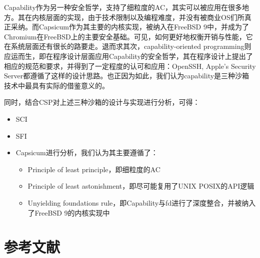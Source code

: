 \documentclass[final,5p,times]{elsarticle}
\begin{document}

Capability作为另一种安全哲学，支持了细粒度的AC，其实可以被应用在很多地方。其在内核层面的实现，由于技术限制以及编程难度，并没有被商业OS们所真正采纳。而Capsicum作为其主要的内核实现，被纳入在FreeBSD 9中，并成为了Chromium在FreeBSD上的主要安全基础。可见，如何更好地权衡开销与性能，它在系统层面还有很长的路要走。退而求其次，capability-oriented programming则应运而生，即在程序设计层面应用Capability的安全哲学，其在程序设计上提出了相应的规范和要求，并得到了一定程度的认可和应用：OpenSSH, Apple's Security Server都遵循了这样的设计思路。也正因为如此，我们认为capability是三种沙箱技术中最具有实际的借鉴意义的。

同时，结合CSP对上述三种沙箱的设计与实现进行分析，可得：
\begin{itemize}
	\item
	SCI
	\item
	SFI
	\item
	Capsicum进行分析，我们认为其主要遵循了：
		\begin{itemize}
			\item Principle of least principle，即细粒度的AC
			\item Principle of least astonishment，即尽可能复用了UNIX POSIX的API逻辑
			\item Unyielding foundations rule，即Capability与fd进行了深度整合，并被纳入了FreeBSD 9的内核实现中
		\end{itemize}
\end{itemize}


\section*{参考文献}





 

\end{document}

